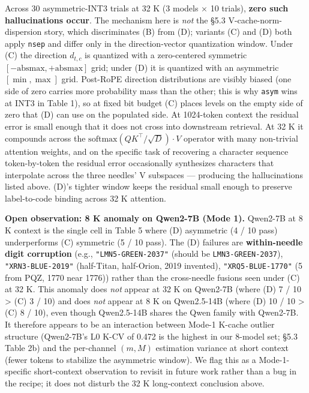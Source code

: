 Across 30 asymmetric-INT3 trials at 32 K (3 models × 10 trials),
\textbf{zero such hallucinations occur}. The mechanism here is
\emph{not} the §5.3 V-cache-norm-dispersion story, which discriminates
(B) from (D); variants (C) and (D) both apply \texttt{nsep} and differ
only in the direction-vector quantization window. Under (C) the
direction \(d_{t,c}\) is quantized with a zero-centered symmetric
\([-\text{absmax}, +\text{absmax}]\) grid; under (D) it is quantized
with an asymmetric \([\min, \max]\) grid. Post-RoPE direction
distributions are visibly biased (one side of zero carries more
probability mass than the other; this is why \texttt{asym} wins at INT3
in Table 1), so at fixed bit budget (C) places levels on the empty side
of zero that (D) can use on the populated side. At 1024-token context
the residual error is small enough that it does not cross into
downstream retrieval. At 32 K it compounds across the
\(\mathrm{softmax}(QK^\top/\sqrt{D}) \cdot V\) operator with many
non-trivial attention weights, and on the specific task of recovering a
character sequence token-by-token the residual error occasionally
synthesizes characters that interpolate across the three needles' V
subspaces --- producing the hallucinations listed above. (D)'s tighter
window keeps the residual small enough to preserve label-to-code binding
across 32 K attention.

\textbf{Open observation: 8 K anomaly on Qwen2-7B (Mode 1).} Qwen2-7B at
8 K context is the single cell in Table 5 where (D) asymmetric (4 / 10
pass) underperforms (C) symmetric (5 / 10 pass). The (D) failures are
\textbf{within-needle digit corruption} (e.g.,
\texttt{"LMN5-GREEN-2037"} (should be \texttt{LMN3-GREEN-2037}),
\texttt{"XRN3-BLUE-2019"} (half-Titan, half-Orion, 2019 invented),
\texttt{"XRQ5-BLUE-1770"} (5 from PQZ, 1770 near 1776)) rather than the
cross-needle fusions seen under (C) at 32 K. This anomaly does
\emph{not} appear at 32 K on Qwen2-7B (where (D) 7 / 10 \textgreater{}
(C) 3 / 10) and does \emph{not} appear at 8 K on Qwen2.5-14B (where (D)
10 / 10 \textgreater{} (C) 8 / 10), even though Qwen2.5-14B shares the
Qwen family with Qwen2-7B. It therefore appears to be an interaction
between Mode-1 K-cache outlier structure (Qwen2-7B's L0 K-CV of 0.472 is
the highest in our 8-model set; §5.3 Table 2b) and the per-channel
\((m, M)\) estimation variance at short context (fewer tokens to
stabilize the asymmetric window). We flag this as a Mode-1-specific
short-context observation to revisit in future work rather than a bug in
the recipe; it does not disturb the 32 K long-context conclusion above.

